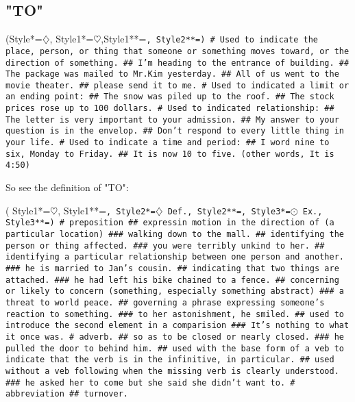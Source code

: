 \subsection{"TO"}
\begin{easylist}[checklist]
\ListProperties(Style*=$\diamondsuit$\quad, Style1*=$\heartsuit$\quad,Style1**=\large\tt\color{google@red}, Style2**=\tt\color{google@blue})
# Used to indicate the place, person, or thing that someone or something moves toward, 
or the direction of something.
## I'm heading to the entrance of building.
## The package was mailed to Mr.Kim yesterday.
## All of us went to the movie theater.
## please send it to me.
# Used to indicated a limit or an ending point:
## The snow was piled up to the roof.
## The stock prices rose up to 100 dollars.
# Used to indicated relationship:
## The letter is very important to your admission.
## My answer to your question is in the envelop.
## Don't respond to every little thing in your life.
# Used to indicate a time and period:
## I word nine to six, Monday to Friday.
## It is now 10 to five. (other words, It is 4:50)
\end{easylist}

\medskip
\noindent So see the definition of "TO":
\begin{easylist}[checklist]
\ListProperties( Style1*=$\heartsuit$\quad, Style1**=\Large\tt\color{google@yellow},
                 Style2*={\color{red}\tt$\diamondsuit$ Def.}\quad, Style2**=\tt\color{google@red},
                 Style3*={\color{red}\tt$\odot$ Ex.}\quad, Style3**=\tt\color{google@blue})
# preposition
## expressin motion in the direction of (a particular location)
### walking down to the mall.
## identifying the person or thing affected.
### you were terribly unkind to her.
## identifying a particular relationship between one person and another.
### he is married to Jan's cousin.
## indicating that two things are attached.
### he had left his bike chained to a fence.
## concerning or likely to concern (something, especially something abstract)
### a threat to world peace.
## governing a phrase expressing someone's reaction to something.
### to her astonishment, he smiled.
## used to introduce the second element in a comparision
### It's nothing to what it once was.
# adverb.
## so as to be closed or nearly closed.
### he pulled the door to behind him.
##  used with the base form of a veb to indicate that the verb is in the
infinitive, in particular.
## used without a veb following when the missing verb is clearly understood.
### he asked her to come but she said she didn't want to.
# abbreviation
## turnover.
\end{easylist}


